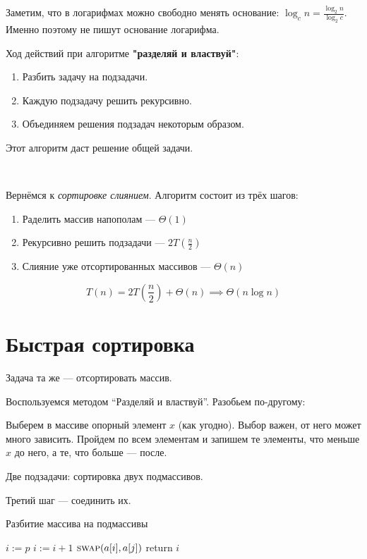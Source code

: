 Заметим, что в логарифмах можно свободно менять основание: $\log_c n = \frac {\log_2 n}{\log_2 c}$. Именно поэтому не пишут основание логарифма.

Ход действий при алгоритме \textbf{"разделяй и властвуй"}:
\begin{enumerate}
	\item Разбить задачу на подзадачи.
	\item Каждую подзадачу решить рекурсивно.
	\item Объединяем решения подзадач некоторым  образом.
\end{enumerate}
Этот алгоритм даст решение общей задачи.

\

Вернёмся к \emph{сортировке слиянием}. Алгоритм состоит из трёх шагов:
\begin{enumerate}
    \item Раделить массив напополам --- $\Theta(1)$
    \item Рекурсивно решить подзадачи --- $2 T(\frac{n}{2})$
    \item Слияние уже отсортированных массивов --- $\Theta(n)$
\end{enumerate}

\[T(n) = 2T\left(\frac n2\right) + \Theta(n) \implies \Theta(n\log n)\]

\section*{Быстрая сортировка}

Задача та же --- отсортировать массив.

Воспользуемся методом ``Разделяй и властвуй''. Разобьем по-другому:

Выберем в массиве опорный элемент $x$ (как угодно). Выбор важен, от него может много зависить. Пройдем по всем элементам и запишем те элементы, что меньше $x$ до него, а те, что больше --- после.

Две подзадачи: сортировка двух подмассивов.

Третий шаг --- соединить их.

\begin{algorithm}
\caption{Разбитие массива на подмассивы}
\begin{algorithmic}[1]
	\State $i \mathrel{:=} p$
			\State $i \mathrel{:=} i + 1$
			\State $\textsc{swap}(a[i], a[j])$
		\EndIf
	\EndFor
	\State return $i$
\EndFunction
\end{algorithmic}
\end{algorithm}

